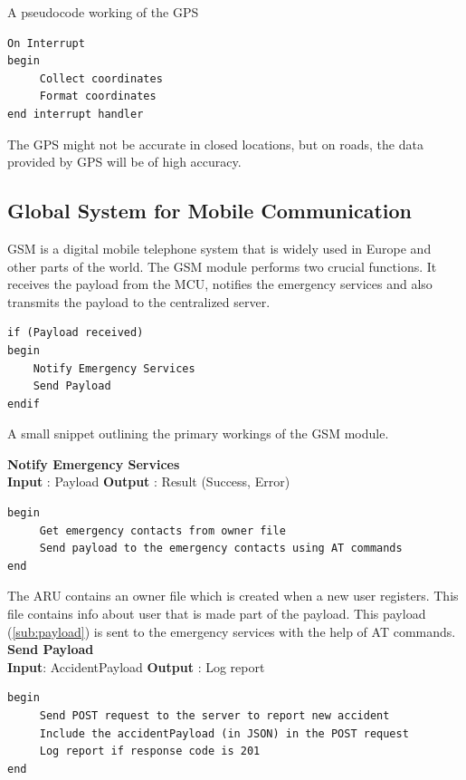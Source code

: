 \documentclass{llncs}
\begin{document}
\noindent A pseudocode working of the GPS \\

\begin{verbatim}
On Interrupt
begin
     Collect coordinates
     Format coordinates
end interrupt handler
\end{verbatim}

The GPS might not be accurate in closed locations, but on roads, the data provided by GPS will be of high accuracy.

\subsection{Global System for Mobile Communication}

GSM is a digital mobile telephone system that is widely used in Europe and other parts of the world. The GSM module performs two crucial functions. It receives the payload from the MCU, notifies the emergency services and also transmits the payload to the centralized server.

\begin{verbatim}
if (Payload received)
begin
    Notify Emergency Services
    Send Payload
endif
\end{verbatim}

A small snippet outlining the primary workings of the GSM module.

\noindent\textbf{Notify Emergency Services} \\
\noindent\textbf{Input} : Payload \newline
\textbf{Output} : Result (Success, Error)

\begin{verbatim}
begin
     Get emergency contacts from owner file
     Send payload to the emergency contacts using AT commands
end 
\end{verbatim} 

The ARU contains an owner file which is created when a new user registers. This file contains info about user that is made part of the payload. This payload (\ref{sub:payload}) is sent to the emergency services with the help of AT commands. \\

\noindent\textbf{Send Payload} \\
\noindent\textbf{Input}: AccidentPayload \newline
\textbf{Output} : Log report

\begin{verbatim}
begin
     Send POST request to the server to report new accident
     Include the accidentPayload (in JSON) in the POST request
     Log report if response code is 201
end 
\end{verbatim}
\end{document}

